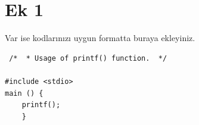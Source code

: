 \clearpage
\section{Ek 1}
\label{ek}

Var ise kodlarınızı uygun formatta buraya ekleyiniz.

\begin{lstlisting}
 /*  * Usage of printf() function.  */  

#include <stdio>  
main () {
	printf();
	}
\end{lstlisting}